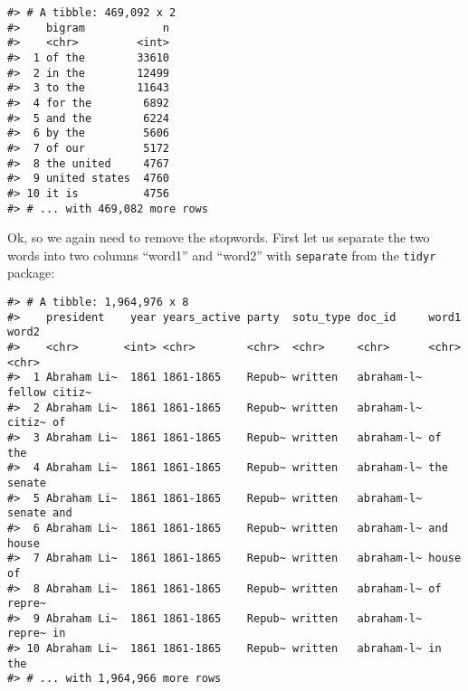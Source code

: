 \documentclass[]{book}
\newenvironment{Shaded}{\begin{snugshade}}{\end{snugshade}}
\newcommand{\DataTypeTok}[1]{\textcolor[rgb]{0.13,0.29,0.53}{#1}}
\newcommand{\DecValTok}[1]{\textcolor[rgb]{0.00,0.00,0.81}{#1}}
\newcommand{\KeywordTok}[1]{\textcolor[rgb]{0.13,0.29,0.53}{\textbf{#1}}}
\newcommand{\NormalTok}[1]{#1}
\newcommand{\OperatorTok}[1]{\textcolor[rgb]{0.81,0.36,0.00}{\textbf{#1}}}
\newcommand{\StringTok}[1]{\textcolor[rgb]{0.31,0.60,0.02}{#1}}
\begin{document}
\begin{verbatim}
#> # A tibble: 469,092 x 2
#>    bigram            n
#>    <chr>         <int>
#>  1 of the        33610
#>  2 in the        12499
#>  3 to the        11643
#>  4 for the        6892
#>  5 and the        6224
#>  6 by the         5606
#>  7 of our         5172
#>  8 the united     4767
#>  9 united states  4760
#> 10 it is          4756
#> # ... with 469,082 more rows
\end{verbatim}

Ok, so we again need to remove the stopwords. First let us separate the two words into two columns ``word1'' and ``word2'' with \texttt{separate} from the \texttt{tidyr} package:

\begin{Shaded}
\end{Shaded}

\begin{verbatim}
#> # A tibble: 1,964,976 x 8
#>    president    year years_active party  sotu_type doc_id     word1  word2 
#>    <chr>       <int> <chr>        <chr>  <chr>     <chr>      <chr>  <chr> 
#>  1 Abraham Li~  1861 1861-1865    Repub~ written   abraham-l~ fellow citiz~
#>  2 Abraham Li~  1861 1861-1865    Repub~ written   abraham-l~ citiz~ of    
#>  3 Abraham Li~  1861 1861-1865    Repub~ written   abraham-l~ of     the   
#>  4 Abraham Li~  1861 1861-1865    Repub~ written   abraham-l~ the    senate
#>  5 Abraham Li~  1861 1861-1865    Repub~ written   abraham-l~ senate and   
#>  6 Abraham Li~  1861 1861-1865    Repub~ written   abraham-l~ and    house 
#>  7 Abraham Li~  1861 1861-1865    Repub~ written   abraham-l~ house  of    
#>  8 Abraham Li~  1861 1861-1865    Repub~ written   abraham-l~ of     repre~
#>  9 Abraham Li~  1861 1861-1865    Repub~ written   abraham-l~ repre~ in    
#> 10 Abraham Li~  1861 1861-1865    Repub~ written   abraham-l~ in     the   
#> # ... with 1,964,966 more rows
\end{verbatim}
\end{document}
